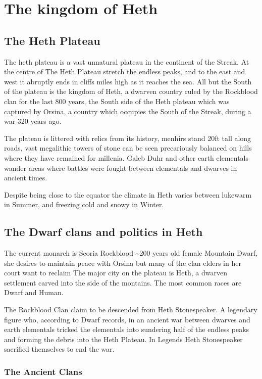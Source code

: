 \documentclass[10pt,twoside,twocolumn,openany,justified,bg=full,nomultitoc]{dndbook}
\begin{document}
\chapter{The kingdom of Heth}
\label{sec-2}
\section{The Heth Plateau}
\label{sec-2-1}
The heth plateau is a vast unnatural plateau in the continent of the Streak. At the centre of The Heth Plateau stretch the endless peaks, and to the east and west it abruptly ends in cliffs miles high as it reaches the sea. All but the South of the plateau is the kingdom of Heth, a dwarven country ruled by the Rockblood clan for the last 800 years, the South side of the Heth plateau which was captured by Orsina, a country which occupies the South of the Streak, during a war 320 years ago. 

The plateau is littered with relics from its history, menhirs stand 20ft tall along roads, vast megalithic towers of stone can be seen precariously balanced on hills where they have remained for millenia. Galeb Duhr and other earth elementals wander areas where battles were fought between elementals and dwarves in ancient times.

Despite being close to the equator the climate in Heth varies between lukewarm in Summer, and freezing cold and snowy in Winter. 

\section{The Dwarf clans and politics in Heth}
\label{sec-2-2}
The current monarch is Scoria Rockblood \textasciitilde{}200 years old female Mountain Dwarf, she desires to maintain peace with Orsina but many of the clan elders in her court want to reclaim The major city on the plateau is Heth, a dwarven settlement carved into the side of the montains. The most common races are Dwarf and Human. 

The Rockblood Clan claim to be descended from Heth Stonespeaker. A legendary figure who, according to Dwarf records, in an ancient war between dwarves and earth elementals tricked the elementals into sundering half of the endless peaks and forming the debris into the Heth Plateau. In Legends Heth Stonespeaker sacrified themselves to end the war. 

\subsection{The Ancient Clans}
\label{sec-2-2-1}
\end{document}
